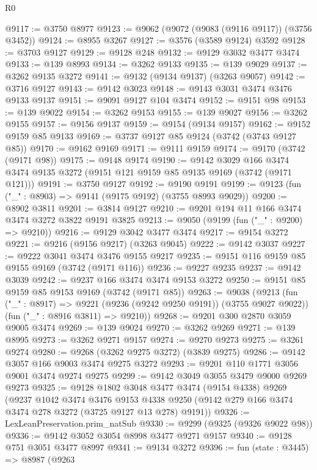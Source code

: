 \begin{lexlean}{R0}
\begin{coremodule}
@9117 := @3750 @8977
@9123 := @9062 (@9072 (@9083 (@9116 @9117)) (@3756 @3452))
@9124 := @8955 @3267
@9127 := @3576 (@3589 @9124) @3592
@9128 := @3703 @9127
@9129 := @9128 @248
@9132 := @9129 @3032 @3477 @3474
@9133 := @139 @8993
@9134 := @3262 @9133
@9135 := @139 @9029
@9137 := @3262 @9135 @3272
@9141 := @9132 (@9134 @9137) (@3263 @9057)
@9142 := @3716 @9127
@9143 := @9142 @3023
@9148 := @9143 @3031 @3474 @3476 @9133 @9137
@9151 := @9091 @9127 @104 @3474
@9152 := @9151 @98
@9153 := @139 @9022
@9154 := @3262 @9153
@9155 := @139 @9027
@9156 := @3262 @9155
@9157 := @9156 @9137
@9159 := @9154 (@9134 @9157)
@9162 := @9152 @9159 @85 @9133
@9169 := @3737 @9127 @85 @9124 (@3742 (@3743 @9127 @85))
@9170 := @9162 @9169
@9171 := @9111 @9159
@9174 := @9170 (@3742 (@9171 @98))
@9175 := @9148 @9174
@9190 := @9142
    @3029
    @166
    @3474
    @3474
    @9135
    @3272
    (@9151 @121 @9159 @85 @9135 @9169 (@3742 (@9171 @121)))
@9191 := @3750 @9127
@9192 := @9190 @9191
@9199 := @9123 (fun ("_" : @8903) => @9141 (@9175 @9192) (@3755 @8993 @9029))
@9200 := @8902 @3811
@9201 := @3814 @9127
@9210 := @9201 @194 @11 @166 @3474 @3474 @3272 @3822 @9191 @3825
@9213 := @9050 (@9199 (fun ("_" : @9200) => @9210))
@9216 := @9129 @3042 @3477 @3474
@9217 := @9154 @3272
@9221 := @9216 (@9156 @9217) (@3263 @9045)
@9222 := @9142 @3037
@9227 := @9222 @3041 @3474 @3476 @9155 @9217
@9235 := @9151 @116 @9159 @85 @9155 @9169 (@3742 (@9171 @116))
@9236 := @9227 @9235
@9237 := @9142 @3039
@9242 := @9237 @166 @3474 @3474 @9153 @3272
@9250 := @9151 @85 @9159 @85 @9153 @9169 (@3742 (@9171 @85))
@9263 := @9038
    (@9213
      (fun ("_" : @8917) => @9221 (@9236 (@9242 @9250 @9191)) (@3755 @9027 @9022))
      (fun ("_" : @8916 @3811) => @9210))
@9268 := @9201 @300 @2870 @3059 @9005 @3474
@9269 := @139 @9024
@9270 := @3262 @9269
@9271 := @139 @8995
@9273 := @3262 @9271 @9157
@9274 := @9270 @9273
@9275 := @3261 @9274
@9280 := @9268 (@3262 @9275 @3272) (@3839 @9275)
@9286 := @9142 @3057 @166 @9003 @3474 @9275 @3272
@9293 := @9201 @110 @1771 @3056 @9001 @3474 @9274 @9275
@9299 := @9142 @3049 @3055 @3479 @9000 @9269 @9273
@9325 := @9128
    @1802
    @3048
    @3477
    @3474
    (@9154 @4338)
    @9269
    (@9237
      @1042
      @3474
      @3476
      @9153
      @4338
      @9250
      (@9142 @279 @166 @3474 @3474 @278 @3272 (@3725 @9127 @13 @278) @9191))
@9326 := LexLeanPreservation.prim_natSub
@9330 := @9299 (@9325 (@9326 @9022 @98))
@9336 := @9142 @3052 @3054 @8998 @3477 @9271 @9157
@9340 := @9128 @751 @3051 @3477 @8997
@9341 := @9134 @3272
@9396 := fun (state : @3445) =>
  @8987
    (@9263

\end{coremodule}
\end{lexlean}
